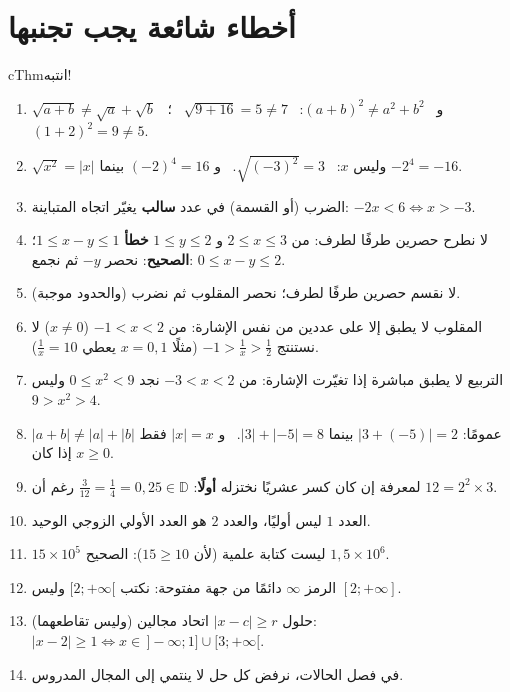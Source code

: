 \documentclass[12pt,a4paper]{article}
\newenvironment{BOX}[2]{\begin{otherlanguage}{english}\begin{arbox}{#1}{#2}}{\end{arbox}\end{otherlanguage}}
\newcommand{\D}{\mathbb{D}}
\begin{document}
\section{أخطاء شائعة يجب تجنبها}
\begin{BOX}{cThm}{انتبه!}
\begin{enumerate}
\item $\sqrt{a+b}\neq\sqrt{a}+\sqrt{b}$ \ و \ $(a+b)^{2}\neq a^{2}+b^{2}$: \ $\sqrt{9+16}=5\neq7$ \ ؛ \ $(1+2)^{2}=9\neq5$.
\item $\sqrt{x^{2}}=|x|$ وليس $x$: \ $\sqrt{(-3)^{2}}=3$. \ و $(-2)^{4}=16$ بينما $-2^{4}=-16$.
\item الضرب (أو القسمة) في عدد \textbf{سالب} يغيّر اتجاه المتباينة: $-2x<6\iff x>-3$.
\item لا نطرح حصرين طرفًا لطرف: من $2\leqslant x\leqslant3$ و $1\leqslant y\leqslant2$ \textbf{خطأ} $1\leqslant x-y\leqslant1$؛ \textbf{الصحيح}: نحصر $-y$ ثم نجمع: $0\leqslant x-y\leqslant2$.
\item لا نقسم حصرين طرفًا لطرف؛ نحصر المقلوب ثم نضرب (والحدود موجبة).
\item المقلوب لا يطبق إلا على عددين من نفس الإشارة: من $-1<x<2$ ($x\neq0$) لا نستنتج $-1>\frac{1}{x}>\frac{1}{2}$ (مثلًا $x=0{,}1$ يعطي $\frac{1}{x}=10$).
\item التربيع لا يطبق مباشرة إذا تغيّرت الإشارة: من $-3<x<2$ نجد $0\leqslant x^{2}<9$ وليس $9>x^{2}>4$.
\item $|a+b|\neq|a|+|b|$ عمومًا: $|3+(-5)|=2$ بينما $|3|+|-5|=8$. \ و $|x|=x$ فقط إذا كان $x\geqslant0$.
\item لمعرفة إن كان كسر عشريًا نختزله \textbf{أولًا}: $\frac{3}{12}=\frac{1}{4}=0{,}25\in\D$ رغم أن $12=2^{2}\times3$.
\item العدد $1$ ليس أوليًا، والعدد $2$ هو العدد الأولي الزوجي الوحيد.
\item $15\times10^{5}$ ليست كتابة علمية (لأن $15\geqslant10$): الصحيح $1{,}5\times10^{6}$.
\item الرمز $\infty$ دائمًا من جهة مفتوحة: نكتب $[2;+\infty[$ وليس $[2;+\infty]$.
\item حلول $|x-c|\geqslant r$ اتحاد مجالين (وليس تقاطعهما): $|x-2|\geqslant1\iff x\in\,]-\infty;1]\cup[3;+\infty[$.
\item في فصل الحالات، نرفض كل حل لا ينتمي إلى المجال المدروس.
\end{enumerate}
\end{BOX}

\clearpage
\end{document}
